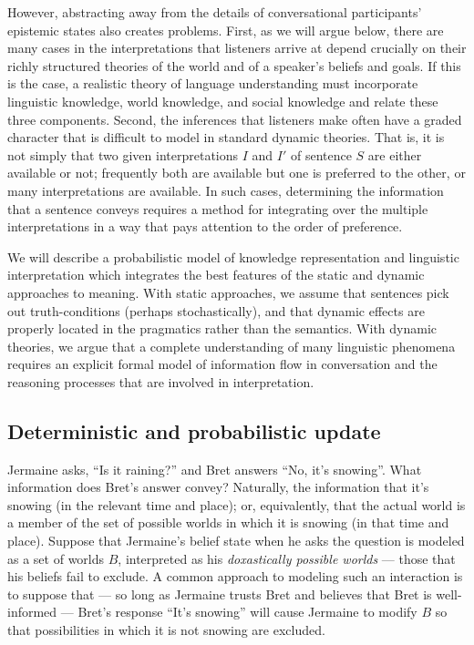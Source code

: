\documentclass[12pt]{article}
\begin{document}
However, abstracting away from the details of conversational participants' epistemic states also creates problems. First, as we will argue below, there are many cases in the interpretations that listeners arrive at depend crucially on their richly structured theories of the world and of a speaker's beliefs and goals. If this is the case, a realistic theory of language understanding must incorporate linguistic knowledge, world knowledge, and social knowledge and relate these three components. Second, the inferences that listeners make often have a graded character that is difficult to model in standard dynamic theories. That is, it is not simply that two given interpretations $I$ and $I'$ of sentence $S$ are either available or not; frequently both are available but one is preferred to the other, or many interpretations are available. In such cases, determining the information that a sentence conveys requires a method for integrating over the multiple interpretations in a way that pays attention to the order of preference. 

We will describe a probabilistic model of knowledge representation and linguistic interpretation which integrates the best features of the static and dynamic approaches to meaning. With static approaches, we assume that sentences pick out truth-conditions (perhaps stochastically), and that dynamic effects are properly located in the pragmatics rather than the semantics. With dynamic theories, we argue that a complete understanding of many linguistic phenomena requires an explicit formal model of information flow in conversation and the reasoning processes that are involved in interpretation. 

\subsection{Deterministic and probabilistic update}
Jermaine asks, ``Is it raining?'' and Bret answers ``No, it's snowing''. What information does Bret's answer convey? Naturally, the information that it's snowing (in the relevant time and place); or, equivalently, that the actual world is a member of the set of possible worlds in which it is snowing (in that time and place). Suppose that Jermaine's belief state when he asks the question is modeled as a set of worlds $B$, interpreted as his \emph{doxastically possible worlds} --- those that his beliefs fail to exclude. A common approach to modeling such an interaction is to suppose that --- so long as Jermaine trusts Bret and believes that Bret is well-informed --- Bret's response ``It's snowing'' will cause Jermaine to modify $B$ so that possibilities in which it is not snowing are excluded. 
\end{document}
